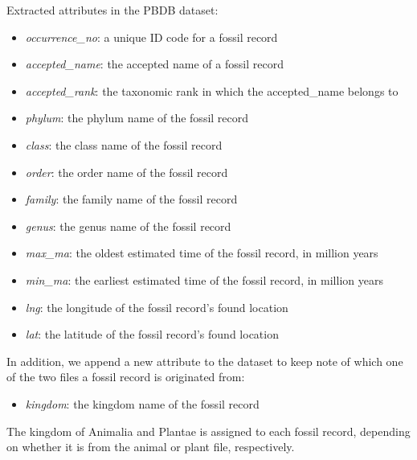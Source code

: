 \documentclass[11pt, a4paper,oneside,chapterprefix=false]{scrbook}
\begin{document}
\noindent Extracted attributes in the PBDB dataset:
\begin{itemize}
	\item \textit{occurrence\_no}: a unique ID code for a fossil record
	\item \textit{accepted\_name}: the accepted name of a fossil record
	\item \textit{accepted\_rank}: the taxonomic rank in which the accepted\_name belongs to 
	\item \textit{phylum}: the phylum name of the fossil record
	\item \textit{class}: the class name of the fossil record
	\item \textit{order}: the order name of the fossil record
	\item \textit{family}: the family name of the fossil record
	\item \textit{genus}: the genus name of the fossil record
	\item \textit{max\_ma}: the oldest estimated time of the fossil record, in million years
	\item \textit{min\_ma}: the earliest estimated time of the fossil record, in million years
	\item \textit{lng}: the longitude of the fossil record's found location 
	\item \textit{lat}: the latitude of the fossil record's found location 
	
\end{itemize}

In addition, we append a new attribute to the dataset to keep note of which one of the two files a fossil record is originated from: 

\begin{itemize}
	\item \textit{kingdom}: the kingdom name of the fossil record	
\end{itemize}

The kingdom of Animalia and Plantae is assigned to each fossil record, depending on whether it is from the animal or plant file, respectively. \\
\end{document}
